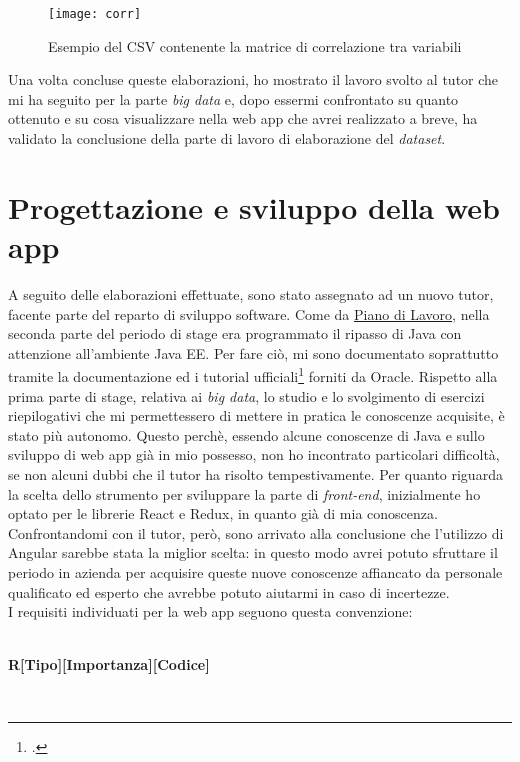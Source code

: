 \begin{figure}[!h]
	\centering
	\texttt{[image: corr]}
	\caption{Esempio del CSV contenente la matrice di correlazione tra variabili}
\end{figure}

Una volta concluse queste elaborazioni, ho mostrato il lavoro svolto al tutor che mi ha seguito per la parte \textit{big data} e, dopo essermi confrontato su quanto ottenuto e su cosa visualizzare nella \gls{web app} che avrei realizzato a breve, ha validato la conclusione della parte di lavoro di elaborazione del \textit{dataset}.

\clearpage
\section{Progettazione e sviluppo della web app}
A seguito delle elaborazioni effettuate, sono stato assegnato ad un nuovo tutor, facente parte del reparto di sviluppo software. Come da \hyperref[pdl]{Piano di Lavoro}, nella seconda parte del periodo di stage era programmato il ripasso di Java con attenzione all'ambiente Java EE. Per fare ciò, mi sono documentato soprattutto tramite la documentazione ed i tutorial ufficiali\footcite{https://docs.oracle.com/javaee/7/tutorial/index.html} forniti da Oracle. Rispetto alla prima parte di stage, relativa ai \textit{big data}, lo studio e lo svolgimento di esercizi riepilogativi che mi permettessero di mettere in pratica le conoscenze acquisite, è stato più autonomo. Questo perchè, essendo alcune conoscenze di Java e sullo sviluppo di \gls{web app} già in mio possesso, non ho incontrato particolari difficoltà, se non alcuni dubbi che il tutor ha risolto tempestivamente.
Per quanto riguarda la scelta dello strumento per sviluppare la parte di \textit{front-end}, inizialmente ho optato per le librerie React e Redux, in quanto già di mia conoscenza. Confrontandomi con il tutor, però, sono arrivato alla conclusione che l'utilizzo di Angular sarebbe stata la miglior scelta: in questo modo avrei potuto sfruttare il periodo in azienda per acquisire queste nuove conoscenze affiancato da personale qualificato ed esperto che avrebbe potuto aiutarmi in caso di incertezze. \\
I requisiti individuati per la \gls{web app} seguono questa convenzione:\\\\
\centerline{\textbf{R[Tipo][Importanza][Codice]}}\\
